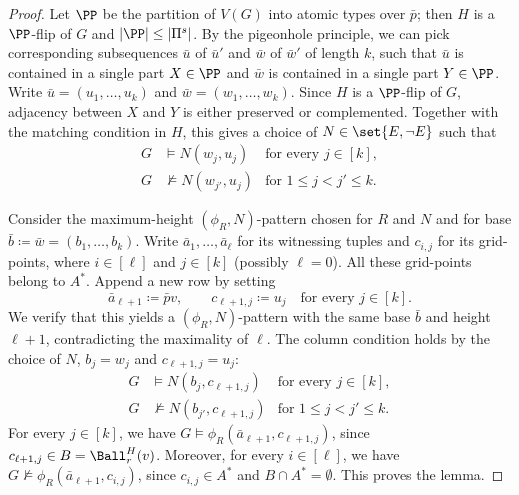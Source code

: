 \begin{proof}
    Let $\PP$ be the partition of $V(G)$ into atomic types over $\bar p$; then $H$ is a $\PP$-flip of $G$ and $|\PP|\le |\Pi^s|$.
    By the pigeonhole principle, we can pick corresponding subsequences $\bar u$ of $\bar u'$ and $\bar w$ of $\bar w'$ of length $k$,
    such that $\bar u$
    is contained in a single part $X\in \PP$
    and $\bar w$ is contained in a single part $Y\in\PP$.
    Write $\bar u=(u_1,\ldots,u_k)$ and $\bar w=(w_1,\ldots,w_k)$.
    Since $H$ is a $\PP$-flip of $G$, adjacency between $X$ and $Y$ is either preserved or complemented.
    Together with the matching condition in $H$, this gives a choice of $N\in\set{E,\neg E}$ such that
    \[
        \begin{aligned}
            G&\models N(w_j,u_j)&\text{for every }j\in[k],\\
            G&\not\models N(w_{j'},u_j)&\text{for }1\le j<j'\le k.
        \end{aligned}
    \]

    Consider the maximum-height $(\phi_R,N)$-pattern chosen for $R$ and $N$ and for  base $\bar b\coloneqq\bar w=(b_1,\ldots,b_k)$.
    Write $\bar a_1,\ldots,\bar a_\ell$ for its witnessing tuples and $c_{i,j}$ for its grid-points, where $i\in[\ell]$ and $j\in[k]$ (possibly $\ell=0$).
    All these grid-points belong to $A^*$.
    Append a new row by setting
    \[
        \bar a_{\ell+1}\coloneqq\bar p v,
        \qquad
        c_{\ell+1,j}\coloneqq u_j\quad\text{for every }j\in[k].
    \]
    We verify that this yields a $(\phi_R,N)$-pattern with the same base $\bar b$ and height $\ell+1$, contradicting the maximality of $\ell$.
    The column condition holds by the choice of $N$, $b_j=w_j$ and $c_{\ell+1,j}=u_j$:
    \[
        \begin{aligned}
            G&\models N(b_j,c_{\ell+1,j})&\text{for every }j\in[k],\\
            G&\not\models N(b_{j'},c_{\ell+1,j})&\text{for }1\le j<j'\le k.
        \end{aligned}
    \]
    For every $j\in[k]$, we have $G\models\phi_R(\bar a_{\ell+1},c_{\ell+1,j})$, since $c_{\ell+1,j}\in B=\Ball_r^H(v)$.
    Moreover, for every $i\in[\ell]$, we have $G\not\models\phi_R(\bar a_{\ell+1},c_{i,j})$, since $c_{i,j}\in A^*$ and $B\cap A^*=\emptyset$. This proves the lemma.
\end{proof}
